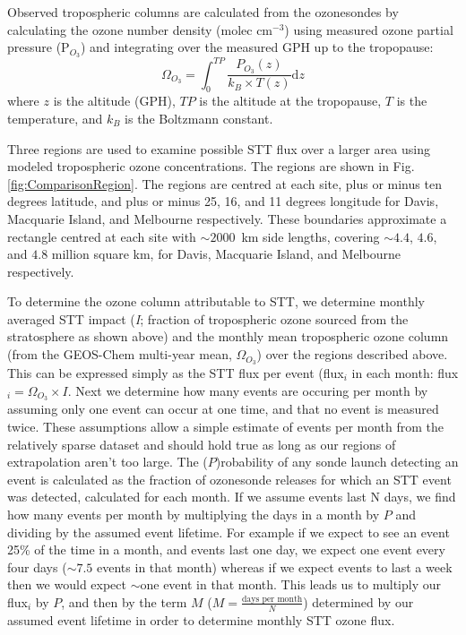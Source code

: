 \documentclass[acp, manuscript]{copernicus} %
\begin{document}
    Observed tropospheric columns are calculated from the ozonesondes by calculating the ozone number density (molec cm$^{-3}$) using measured ozone partial pressure (P$_{O_3}$) and integrating over the measured GPH up to the tropopause:
    $$ \Omega_{O_3} = \int_{0}^{TP} \frac{P_{O_3}(z)}{k_B \times T(z)} \mathrm{d}z $$
    where $z$ is the altitude (GPH), $TP$ is the altitude at the tropopause, $T$ is the temperature, and $k_B$ is the Boltzmann constant.
    
    Three regions are used to examine possible STT flux over a larger area using modeled tropospheric ozone concentrations.
    The regions are shown in Fig. \ref{fig:ComparisonRegion}.
    The regions are centred at each site, plus or minus ten degrees latitude, and plus or minus 25, 16, and 11 degrees longitude for Davis, Macquarie Island, and Melbourne respectively.
    These boundaries approximate a rectangle centred at each site with $\sim 2000$~km side lengths, covering $\sim 4.4$, $4.6$, and $4.8$ million square km, for Davis, Macquarie Island, and Melbourne respectively.
    
    To determine the ozone column attributable to STT, we determine monthly averaged STT impact (\textit{I}; fraction of tropospheric ozone sourced from the stratosphere as shown above) and the monthly mean tropospheric ozone column (from the GEOS-Chem multi-year mean, $\Omega_{O_3}$) over the regions described above.
    This can be expressed simply as the STT flux per event (flux$_i$ in each month: flux$_i = \Omega_{O_3} \times I$.
    Next we determine how many events are occuring per month by assuming only one event can occur at one time, and that no event is measured twice.
    These assumptions allow a simple estimate of events per month from the relatively sparse dataset and should hold true as long as our regions of extrapolation aren't too large.
    The ($P$)robability of any sonde launch detecting an event is calculated as the fraction of ozonesonde releases for which an STT event was detected, calculated for each month.
    If we assume events last N days, we find how many events per month by multiplying the days in a month by $P$ and dividing by the assumed event lifetime.
    For example if we expect to see an event 25\% of the time in a month, and events last one day, we expect one event every four days ($\sim 7.5$ events in that month) whereas if we expect events to last a week then we would expect $\sim$one event in that month.
    This leads us to multiply our flux$_i$ by $P$, and then by the term $M$ ($M= \frac{\text{days per month}}{N}$) determined by our assumed event lifetime in order to determine monthly STT ozone flux.
    
\end{document}
